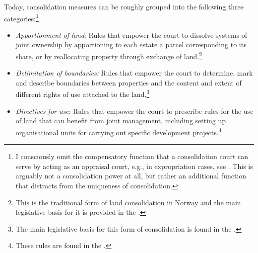 
Today, consolidation measures can be roughly grouped into the following three categories:\footnote{I consciously omit the compensatory function that a consolidation court can serve by acting as an appraisal court, e.g., in expropriation cases, see \dni\cite[1-4(d)]{lca13}. This is arguably not a consolidation power at all, but rather an additional function that distracts from the uniqueness of consolidation.}

\begin{itemize}
\item \emph{Apportionment of land}: Rules that empower the court to dissolve systems of joint ownership by apportioning to each estate a parcel corresponding to its share, or by reallocating property through exchange of land.\footnote{This is the traditional form of land consolidation in Norway and the main legislative basis for it is provided in the \dni\cite[2]{lca79}.}
\item \emph{Delimitation of boundaries:} Rules that empower the court to determine, mark and describe boundaries between properties and the content and extent of different rights of use attached to the land.\footnote{The main legislative basis for this form of consolidation is found in the \dni\cite[88]{lca79}.}
\item \emph{Directives for use}: Rules that empower the court to prescribe rules for the use of land that can benefit from joint management, including setting up organisational units for carrying out specific development projects.\footnote{These rules are found in the \dni\cite[2 c), 34, 35]{lca79}.}
\end{itemize}


